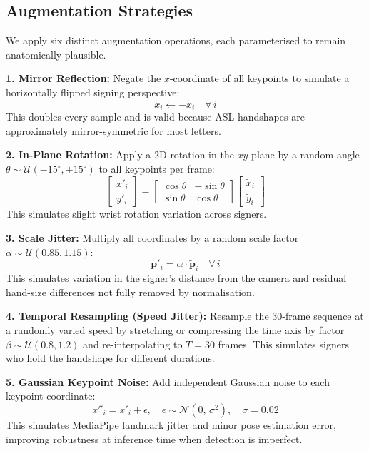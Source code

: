 \documentclass[conference]{IEEEtran}
\begin{document}
\subsection{Augmentation Strategies}

We apply six distinct augmentation operations, each parameterised to remain
anatomically plausible.

\textbf{1. Mirror Reflection:} Negate the $x$-coordinate of all keypoints to
simulate a horizontally flipped signing perspective:
\begin{equation}
  \tilde{x}_i \leftarrow -\tilde{x}_i \quad \forall\, i
\end{equation}
This doubles every sample and is valid because ASL handshapes are approximately
mirror-symmetric for most letters.

\textbf{2. In-Plane Rotation:} Apply a 2D rotation in the $xy$-plane by a
random angle $\theta \sim \mathcal{U}(-15^\circ, +15^\circ)$ to all keypoints
per frame:
\begin{equation}
  \begin{bmatrix} x'_i \\ y'_i \end{bmatrix}
  = \begin{bmatrix} \cos\theta & -\sin\theta \\ \sin\theta & \cos\theta
    \end{bmatrix}
  \begin{bmatrix} \tilde{x}_i \\ \tilde{y}_i \end{bmatrix}
\end{equation}
This simulates slight wrist rotation variation across signers.

\textbf{3. Scale Jitter:} Multiply all coordinates by a random scale factor
$\alpha \sim \mathcal{U}(0.85, 1.15)$:
\begin{equation}
  \mathbf{p}'_i = \alpha \cdot \tilde{\mathbf{p}}_i \quad \forall\, i
\end{equation}
This simulates variation in the signer's distance from the camera and residual
hand-size differences not fully removed by normalisation.

\textbf{4. Temporal Resampling (Speed Jitter):} Resample the 30-frame sequence
at a randomly varied speed by stretching or compressing the time axis by factor
$\beta \sim \mathcal{U}(0.8, 1.2)$ and re-interpolating to $T=30$ frames. This
simulates signers who hold the handshape for different durations.

\textbf{5. Gaussian Keypoint Noise:} Add independent Gaussian noise to each
keypoint coordinate:
\begin{equation}
  x''_i = x'_i + \epsilon, \quad \epsilon \sim \mathcal{N}(0,\, \sigma^2),
  \quad \sigma = 0.02
\end{equation}
This simulates MediaPipe landmark jitter and minor pose estimation error,
improving robustness at inference time when detection is imperfect.
\end{document}
